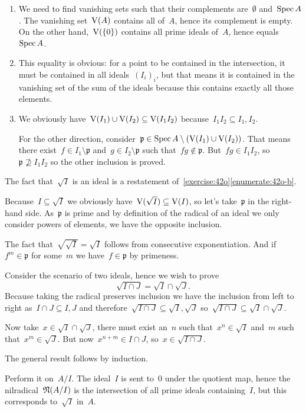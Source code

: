 \begin{exercise}
  \begin{enumerate}
    \item We need to find vanishing sets such that their complements are~$\emptyset$ and~$\operatorname{Spec} A$. The vanishing set~$\operatorname{V}(A)$ contains all of~$A$, hence its complement is empty. On the other hand,~$\operatorname{V}(\left\{ 0 \right\})$ contains all prime ideals of~$A$, hence equals~$\operatorname{Spec} A$.

    \item This equality is obvious: for a point to be contained in the intersection, it must be contained in all ideals~$(I_i)_i$, but that means it is contained in the vanishing set of the sum of the ideals because this contains exactly all those elements.

    \item We obviously have~$\operatorname{V}(I_1)\cup\operatorname{V}(I_2)\subseteq\operatorname{V}(I_1I_2)$ because~$I_1I_2\subseteq I_1,I_2$.

      For the other direction, consider~$\mathfrak{p}\in\operatorname{Spec} A\setminus(\operatorname{V}(I_1)\cup\operatorname{V}(I_2))$. That means there exist~$f\in I_1\setminus\mathfrak{p}$ and~$g\in I_2\setminus\mathfrak{p}$ such that~$fg\notin\mathfrak{p}$. But~$fg\in I_1I_2$, so~$\mathfrak{p}\nsupseteq I_1I_2$ so the other inclusion is proved.
  \end{enumerate}
\end{exercise}

\begin{exercise} %
  \label{exercise:44d}
  The fact that~$\sqrt{I}$ is an ideal is a restatement of~\autoref{exercise:42o}\ref{enumerate:42o-b}.
  
  Because~$I\subseteq\sqrt{I}$ we obviously have~$\operatorname{V}(\sqrt{I})\subseteq\operatorname{V}(I)$, so let's take~$\mathfrak{p}$ in the right-hand side. As~$\mathfrak{p}$ is prime and by definition of the radical of an ideal we only consider powers of elements, we have the opposite inclusion.

  The fact that~$\sqrt{\sqrt{I}}=\sqrt{I}$ follows from consecutive exponentiation. And if~$f^m\in\mathfrak{p}$ for some~$m$ we have~$f\in\mathfrak{p}$ by primeness.
\end{exercise}

\begin{exercise}
  Consider the scenario of two ideals, hence we wish to prove
  \begin{equation}
    \sqrt{I\cap J}=\sqrt{I}\cap\sqrt{J}.
  \end{equation}
  Because taking the radical preserves inclusion we have the inclusion from left to right as~$I\cap J\subseteq I,J$ and therefore~$\sqrt{I\cap J}\subseteq\sqrt{I},\sqrt{J}$ so~$\sqrt{I\cap J}\subseteq\sqrt{I}\cap\sqrt{J}$.
  
  Now take~$x\in\sqrt{I}\cap\sqrt{J}$, there must exist an~$n$ such that~$x^n\in\sqrt{I}$ and~$m$ such that~$x^m\in\sqrt{J}$. But now~$x^{n+m}\in I\cap J$, so~$x\in\sqrt{I\cap J}$.

  The general result follows by induction.
\end{exercise}

\begin{exercise}
  Perform it on~$A/I$. The ideal~$I$ is sent to~$0$ under the quotient map, hence the nilradical~$\mathfrak{N}(A/I)$ is the intersection of all prime ideals containing~$I$, but this corresponds to~$\sqrt{I}$ in~$A$.
\end{exercise}
